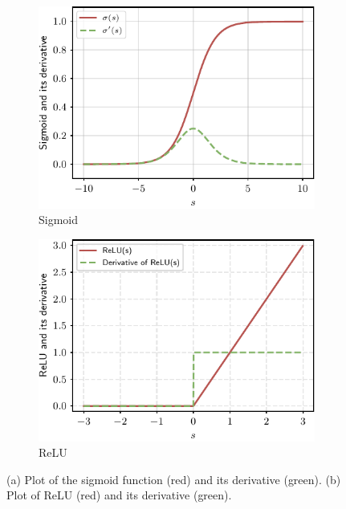 \begin{figure}
    \centering
    \begin{subfigure}[b]{0.48\textwidth}
    \includegraphics[width=1.0\textwidth]{images/sigmoid_and_derivative}
    \caption{Sigmoid}
    \label{fig:sigmoid_and_derivative}
    \end{subfigure}
    \hfill
    \begin{subfigure}[b]{0.48\textwidth}
    \includegraphics[width=1.0\textwidth]{images/relu_and_derivative}
    \caption{ReLU}
    \label{fig:relu_and_derivative}
    \end{subfigure}
    \caption{(a) Plot of the sigmoid function ({\color{drawred}red}) and its derivative ({\color{drawgreen}green}). (b) Plot of ReLU ({\color{drawred}red}) and its derivative ({\color{drawgreen}green}).}
\end{figure}

